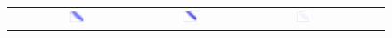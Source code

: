 \documentclass[letterpaper]{article}
\newcommand{\nn}{0.16}
\begin{document}
\begin{figure}[t!]
\begin{center}
\begin{tabular}{cccccc}
& \hspace{-3mm} \includegraphics[width=\nn\textwidth]{Figs2/col_c_stan10000_02.png}
& \hspace{-3mm} \includegraphics[width=\nn\textwidth]{Figs2/col_c_stan_10000_000001.png}
& \hspace{-3mm} \includegraphics[width=\nn\textwidth]{Figs2/col_c_ang10000_02_001.png}

\end{tabular}
\end{center}
\end{figure}
\end{document}
